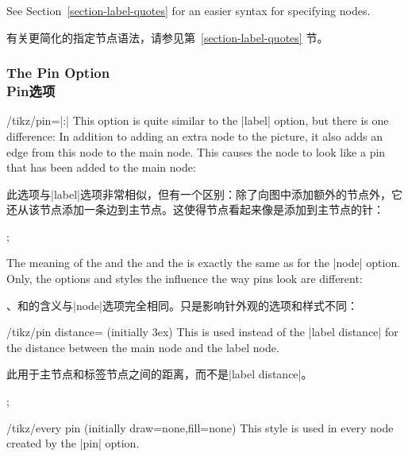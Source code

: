 See Section~\ref{section-label-quotes} for an easier syntax for specifying
nodes.

有关更简化的指定节点语法，请参见第~\ref{section-label-quotes} 节。

\subsubsection{The Pin Option\\Pin选项}

\begin{key}{/tikz/pin=|:|}
    This option is quite similar to the |label| option, but there is one
    difference: In addition to adding an extra node to the picture, it also
    adds an edge from this node to the main node. This causes the node to look
    like a pin that has been added to the main node:
    
    此选项与|label|选项非常相似，但有一个区别：除了向图中添加额外的节点外，它还从该节点添加一条边到主节点。这使得节点看起来像是添加到主节点的针：
\begin{codeexample}[]
\tikz \node [circle,fill=blue!50,minimum size=1cm,pin=60:$q_0$] {};
\end{codeexample}

    The meaning of the  and the  and the 
    is exactly the same as for the |node| option. Only, the options and styles
    the influence the way pins look are different:
    
    、和的含义与|node|选项完全相同。只是影响针外观的选项和样式不同：
    \begin{key}{/tikz/pin distance= (initially 3ex)}
        This  is used instead of the |label distance| for the
        distance between the main node and the label node.
        
        此用于主节点和标签节点之间的距离，而不是|label distance|。
\begin{codeexample}[]
\tikz[pin distance=1cm]
  ;
\end{codeexample}
    \end{key}

    \begin{stylekey}{/tikz/every pin (initially {draw=none,fill=none})}
        This style is used in every node created by the |pin| option.


\end{stylekey}
\end{key}
